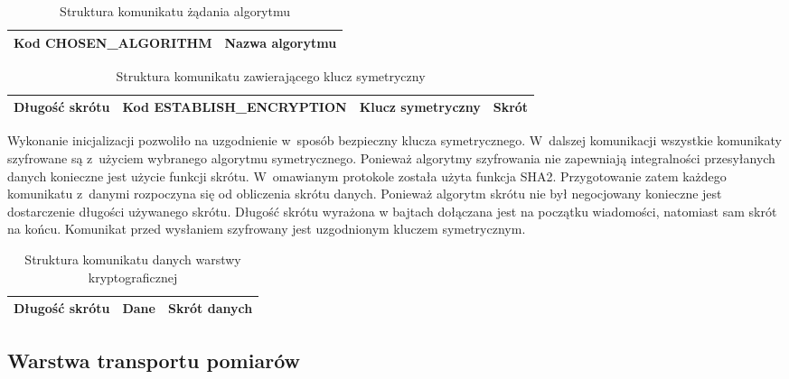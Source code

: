 \begin{table}[H]
\centering
\caption{Struktura komunikatu żądania algorytmu }

\begin{tabular}{|p{5cm}|p{6cm}|}
\hline
\raggedright{Kod CHOSEN\_ALGORITHM} & Nazwa algorytmu\\
\hline
\end{tabular}
\end{table}

\begin{table}[H]
\centering
\caption{Struktura komunikatu zawierającego klucz symetryczny}

\begin{tabular}{|p{3cm}|p{5cm}|p{3cm}|p{2cm}|}
\hline
Długość skrótu & \raggedright{Kod ESTABLISH\_ENCRYPTION} & \raggedright{Klucz symetryczny} & Skrót \\
\hline
\end{tabular}
\end{table}

Wykonanie inicjalizacji pozwoliło na uzgodnienie w~sposób bezpieczny
klucza symetrycznego. W~dalszej komunikacji wszystkie komunikaty
szyfrowane są z~użyciem wybranego algorytmu symetrycznego. Ponieważ
algorytmy szyfrowania nie zapewniają integralności przesyłanych danych
konieczne jest użycie funkcji skrótu. W~omawianym protokole została
użyta funkcja SHA2. Przygotowanie zatem każdego komunikatu z~danymi
rozpoczyna się od obliczenia skrótu danych. Ponieważ algorytm skrótu
nie był negocjowany konieczne jest dostarczenie długości używanego
skrótu. Długość skrótu wyrażona w bajtach dołączana jest na początku
wiadomości, natomiast sam skrót na końcu. Komunikat przed wysłaniem
szyfrowany jest uzgodnionym kluczem symetrycznym.

\begin{table}[H]
\centering
\caption{Struktura komunikatu danych warstwy kryptograficznej }

\begin{tabular}{|p{3cm}|p{6cm}|p{3cm}|}
\hline
Długość skrótu & Dane & Skrót danych\\
\hline
\end{tabular}
\end{table}

\subsection[Warstwa transportu pomiarów][Warstwa transportu pomiarów]{Warstwa transportu pomiarów}

